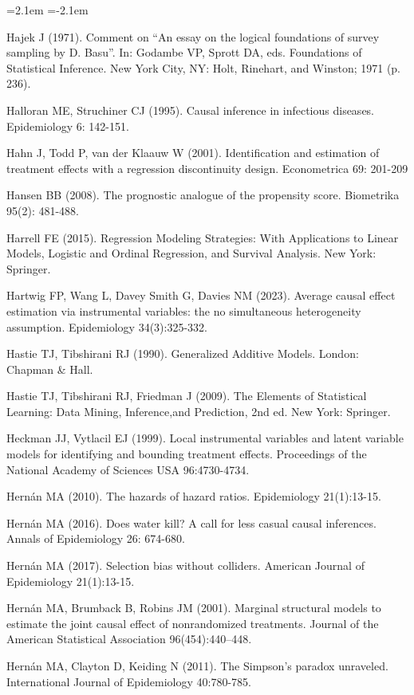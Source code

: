 \begin{list}{}{\leftmargin=2.1em   \itemindent=-2.1em \parsep=0pt \itemsep=1.6pt \topsep=4pt \rightmargin=0pt}
\item Hajek J (1971). Comment on ``An essay on the logical foundations of survey sampling by D. Basu''. In: Godambe VP, Sprott DA, eds. Foundations of Statistical Inference. New York City, NY: Holt, Rinehart, and Winston; 1971 (p. 236).
\item Halloran ME, Struchiner CJ (1995). Causal inference in infectious diseases. Epidemiology 6: 142-151.
\item Hahn J, Todd P, van der Klaauw W (2001). Identification and estimation of treatment effects with a regression discontinuity design. Econometrica 69: 201-209
\item Hansen BB (2008). The prognostic analogue of the propensity score. Biometrika 95(2): 481-488.
\item Harrell FE (2015). Regression Modeling Strategies: With Applications to Linear Models, Logistic and Ordinal Regression, and Survival Analysis. New York: Springer.
\item Hartwig FP, Wang L, Davey Smith G, Davies NM (2023). Average causal effect estimation via instrumental variables: the no simultaneous heterogeneity assumption. Epidemiology 34(3):325-332.
\item Hastie TJ, Tibshirani RJ (1990). Generalized Additive Models. London: Chapman \& Hall.
\item Hastie TJ, Tibshirani RJ, Friedman J (2009). The Elements of Statistical Learning: Data Mining, Inference,and Prediction, 2nd ed. New York: Springer.
\item Heckman JJ, Vytlacil EJ (1999). Local instrumental variables and latent variable models for identifying and bounding treatment effects. Proceedings of the National Academy of Sciences USA 96:4730-4734.
\item Hernán MA (2010). The hazards of hazard ratios. Epidemiology 21(1):13-15.
\item Hernán MA (2016). Does water kill? A call for less casual causal inferences. Annals of Epidemiology 26: 674-680.
\item Hernán MA (2017). Selection bias without colliders. American Journal of Epidemiology 21(1):13-15.
\item Hernán MA, Brumback B, Robins JM (2001). Marginal structural models to estimate the joint causal effect of nonrandomized treatments. Journal of the American Statistical Association 96(454):440–448.
\item Hernán MA, Clayton D, Keiding N (2011). The Simpson's paradox unraveled. International Journal of Epidemiology 40:780-785.

\end{list}
